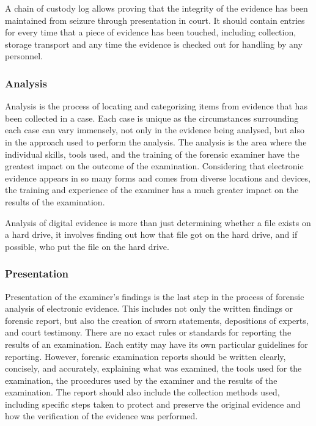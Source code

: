 A chain of custody log allows proving that the integrity of the evidence has been maintained from seizure
through presentation in court. It should contain entries for every time that a piece of evidence
has been touched, including collection, storage transport and any time the evidence is checked out for
handling by any personnel.

\subsubsection*{Analysis}

Analysis is the process of locating and categorizing items from evidence
that has been collected in a case. Each case is unique as the
circumstances surrounding each case can vary immensely, not only in the evidence being analysed, but also in the
approach used to perform the analysis. The analysis is the area where
the individual skills, tools used, and the training of the forensic examiner have
the greatest impact on the outcome of the examination. Considering that electronic evidence
appears in so many forms and comes from diverse locations and devices,
the training and experience of the examiner has a much greater impact
on the results of the examination.

Analysis of digital evidence is more than just determining whether a file exists on a hard drive, it involves finding out how
that file got on the hard drive, and if possible, who put the file on the hard drive.

\subsubsection*{Presentation}

Presentation of the examiner's findings is the last step in the process of forensic
analysis of electronic evidence. This includes not only the written findings or forensic
report, but also the creation of sworn statements, depositions of experts, and court testimony.
There are no exact rules or standards for reporting the results of an
examination. Each entity may have its own particular guidelines
for reporting. However, forensic examination reports should be written clearly, concisely,
and accurately, explaining what was examined, the tools used for the examination,
the procedures used by the examiner and the results of the examination.
The report should also include the collection methods used, including specific steps
taken to protect and preserve the original evidence and how the verification of the
evidence was performed.

